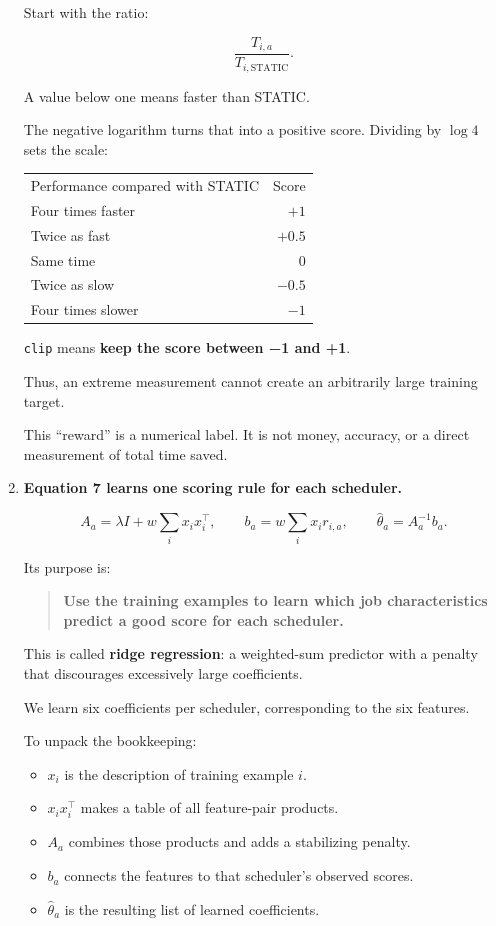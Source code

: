 \documentclass[11pt,a4paper]{article}
\providecommand{\tightlist}{\setlength{\itemsep}{0pt}\setlength{\parskip}{3pt}}
\newcommand{\toprule}{\hline\noalign{\vskip3pt}}
\newcommand{\midrule}{\noalign{\vskip2pt}\hline\noalign{\vskip3pt}}
\newcommand{\bottomrule}{\noalign{\vskip3pt}\hline}
\begin{document}
\begin{enumerate}
  Start with the ratio:

  \[
  \frac{T_{i,a}}{T_{i,\mathrm{STATIC}}}.
  \]

  A value below one means faster than STATIC.

  The negative logarithm turns that into a positive score. Dividing by \(\log4\) sets the scale:

  {\def\LTcaptype{none} %
  \begin{longtable}[]{@{}lr@{}}
  \toprule\noalign{}
  Performance compared with STATIC & Score \\
  \midrule\noalign{}
  \endhead
  \bottomrule\noalign{}
  \endlastfoot
  Four times faster & \(+1\) \\
  Twice as fast & \(+0.5\) \\
  Same time & \(0\) \\
  Twice as slow & \(-0.5\) \\
  Four times slower & \(-1\) \\
  \end{longtable}
  }

  \texttt{clip} means \textbf{keep the score between −1 and +1}.

  Thus, an extreme measurement cannot create an arbitrarily large training target.

  This ``reward'' is a numerical label. It is not money, accuracy, or a direct measurement of total time saved.
\item
  \textbf{Equation 7 learns one scoring rule for each scheduler.}

  \[
  A_a
  =
  \lambda I+w\sum_i x_i x_i^\top,
  \qquad
  b_a
  =
  w\sum_i x_i r_{i,a},
  \qquad
  \hat\theta_a=A_a^{-1}b_a.
  \]

  Its purpose is:

  \begin{quote}
  \textbf{Use the training examples to learn which job characteristics predict a good score for each scheduler.}
  \end{quote}

  This is called \textbf{ridge regression}: a weighted-sum predictor with a penalty that discourages excessively large coefficients.

  We learn six coefficients per scheduler, corresponding to the six features.

  To unpack the bookkeeping:

  \begin{itemize}
  \tightlist
  \item
    \(x_i\) is the description of training example \(i\).
  \item
    \(x_ix_i^\top\) makes a table of all feature-pair products.
  \item
    \(A_a\) combines those products and adds a stabilizing penalty.
  \item
    \(b_a\) connects the features to that scheduler's observed scores.
  \item
    \(\hat\theta_a\) is the resulting list of learned coefficients.
  \end{itemize}


\end{enumerate}
\end{document}
